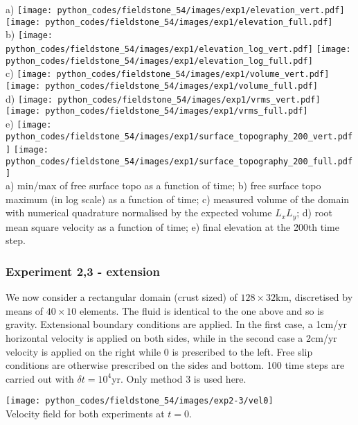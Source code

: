 \begin{center}
a) \texttt{[image: python\_codes/fieldstone\_54/images/exp1/elevation\_vert.pdf]}
   \texttt{[image: python\_codes/fieldstone\_54/images/exp1/elevation\_full.pdf]}\\
b) \texttt{[image: python\_codes/fieldstone\_54/images/exp1/elevation\_log\_vert.pdf]}
   \texttt{[image: python\_codes/fieldstone\_54/images/exp1/elevation\_log\_full.pdf]}\\
c) \texttt{[image: python\_codes/fieldstone\_54/images/exp1/volume\_vert.pdf]}
   \texttt{[image: python\_codes/fieldstone\_54/images/exp1/volume\_full.pdf]}\\
d) \texttt{[image: python\_codes/fieldstone\_54/images/exp1/vrms\_vert.pdf]}
   \texttt{[image: python\_codes/fieldstone\_54/images/exp1/vrms\_full.pdf]}\\
e) \texttt{[image: python\_codes/fieldstone\_54/images/exp1/surface\_topography\_200\_vert.pdf]}
   \texttt{[image: python\_codes/fieldstone\_54/images/exp1/surface\_topography\_200\_full.pdf]}\\
{\captionfont 
a) min/max of free surface topo as a function of time; 
b) free surface topo maximum (in log scale) as a function of time; 
c) measured volume of the domain with numerical quadrature normalised by the expected volume $L_xL_y$;
d) root mean square velocity as a function of time;
e) final elevation at the 200th time step.}
\end{center}

\subsubsection*{Experiment 2,3 - extension}

We now consider a rectangular domain (crust sized) of $128\times32$km, discretised by means of $40\times10$ elements.
The fluid is identical to the one above and so is gravity. 
Extensional boundary conditions are applied. In the first case, a 1cm/yr horizontal velocity is applied on both sides, while in the second case a 2cm/yr velocity is applied on the right while 0 is prescribed to the left. Free slip conditions are otherwise prescribed on the sides and bottom. 100 time steps are carried out with $\delta t=10^4$yr. Only method 3 is used here.

\begin{center}
\texttt{[image: python\_codes/fieldstone\_54/images/exp2-3/vel0]}\\
{\captionfont Velocity field for both experiments at $t=0$.}
\end{center}


